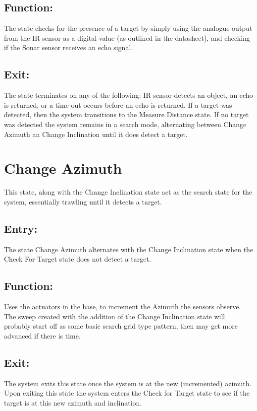 \documentclass[]{article}
\begin{document}
\subsection{Function:}
The state checks for the presence of a target by simply using the analogue output from the IR sensor as a digital value (as outlined in the datasheet), and checking if the Sonar sensor receives an echo signal.

\subsection{Exit:}
The state terminates on any of the following: IR sensor detects an object, an echo is returned, or a time out occurs before an echo is returned.
If a target was detected, then the system transitions to the Measure Distance state. If no target was detected the system remains in a search mode, alternating between Change Azimuth an Change Inclination until it does detect a target.

\section{Change Azimuth}
This state, along with the Change Inclination state act as the search state for the system, essentially trawling until it detects a target.

\subsection{Entry:}
The state Change Azimuth alternates with the Change Inclination state when the Check For Target state does not detect a target.

\subsection{Function:}
Uses the actuators in the base, to increment the Azimuth the sensors observe. The sweep created with the addition of the Change Inclination state will probably start off as some basic search grid type pattern, then may get more advanced if there is time.

\subsection{Exit:}
The system exits this state once the system is at the new (incremented) azimuth. Upon exiting this state the system enters the Check for Target state to see if the target is at this new azimuth and inclination.
\end{document}
